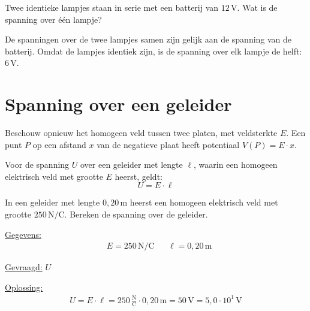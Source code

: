 \documentclass{ximera}
\begin{document}
\begin{question}
    Twee identieke lampjes staan in serie met een batterij van $12 \, \mathrm{V}$. Wat is de spanning over één lampje?

    \begin{multipleChoice}
    \end{multipleChoice}

    \begin{solution}\nl
        De spanningen over de twee lampjes samen zijn gelijk aan de spanning van de batterij. Omdat de lampjes identiek zijn, is de spanning over elk lampje de helft: $6 \, \mathrm{V}$.
    \end{solution}
\end{question}

\section{Spanning over een geleider}
Beschouw opnieuw het homogeen veld tussen twee platen, met veldsterkte $E$. Een punt $P$ op een afstand $x$ van de negatieve plaat heeft potentiaal $V(P) = E \cdot x$.

\begin{proposition}[foldable=true,title={Spanning over een geleider}]\nl
Voor de spanning $U$ over een geleider met lengte $\ell$, waarin een homogeen elektrisch veld met grootte $E$ heerst, geldt:
\begin{equation}\label{eq:spanning_geleider}
    U = E \cdot \ell
\end{equation}
\end{proposition}

\begin{example}[foldable=true,title={Voorbeeld: spanning over een geleider}]\nl
In een geleider met lengte $0{,}20 \, \mathrm{m}$ heerst een homogeen elektrisch veld met grootte $250 \, \mathrm{N/C}$. Bereken de spanning over de geleider.

\begin{solution}\nl
\underline{Gegevens:}
\begin{align*}
    & E = 250 \, \mathrm{N/C} & & \ell = 0{,}20 \, \mathrm{m}
\end{align*}

\underline{Gevraagd:} $U$

\underline{Oplossing:}
\begin{align*}
    U = E \cdot \ell = 250 \, \frac{\mathrm{N}}{\mathrm{C}} \cdot 0{,}20 \, \mathrm{m} = 50 \, \mathrm{V} = \boxed{5{,}0 \cdot 10^{1} \, \mathrm{V}}
\end{align*}
\end{solution}
\end{example}
\end{document}
